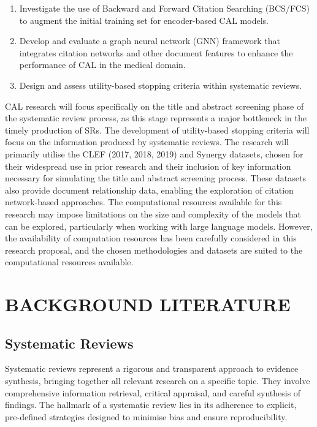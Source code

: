 \documentclass[10pt, english]{article}
\begin{document}
\begin{enumerate}
    \item Investigate the use of Backward and Forward Citation Searching (BCS/FCS) to augment the initial training set for encoder-based CAL models.
    \item Develop and evaluate a graph neural network (GNN) framework that integrates citation networks and other document features to enhance the performance of CAL in the medical domain.
    \item Design and assess utility-based stopping criteria within systematic reviews.
\end{enumerate}

CAL research will focus specifically on the title and abstract screening phase of the systematic review process, as this stage represents a major bottleneck in the timely production of SRs. The development of utility-based stopping criteria will focus on the information produced by systematic reviews. The research will primarily utilise the CLEF (2017, 2018, 2019) and Synergy datasets, chosen for their widespread use in prior research and their inclusion of key information necessary for simulating the title and abstract screening process. These datasets also provide document relationship data, enabling the exploration of citation network-based approaches. The computational resources available for this research may impose limitations on the size and complexity of the models that can be explored, particularly when working with large language models. However, the availability of computation resources has been carefully considered in this research proposal, and the chosen methodologies and datasets are suited to the computational resources available.


\section{BACKGROUND LITERATURE}

\subsection{Systematic Reviews}


Systematic reviews represent a rigorous and transparent approach to evidence synthesis, bringing together all relevant research on a specific topic. They involve comprehensive information retrieval, critical appraisal, and careful synthesis of findings. The hallmark of a systematic review lies in its adherence to explicit, pre-defined strategies designed to minimise bias and ensure reproducibility.
\end{document}
